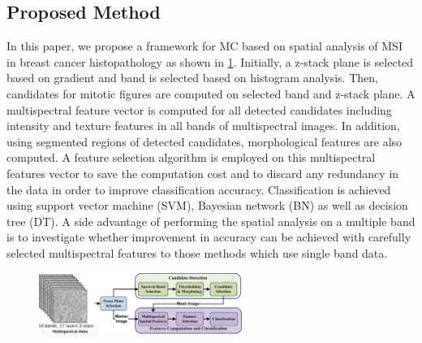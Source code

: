 \documentclass[10pt,twocolumn,letterpaper]{article}
\begin{document}
\subsection{Proposed Method}
In this paper, we propose a framework for MC based on spatial analysis of MSI in breast cancer histopathology as shown in \ref{fig:framework}. Initially, a z-stack plane is selected based on gradient and band is selected based on histogram analysis. Then, candidates for mitotic figures  are computed on selected band and z-stack plane. A multispectral feature vector is computed for all detected candidates including intensity and texture features in all bands of multispectral images. In addition, using segmented regions of detected candidates, morphological features are also computed. A feature selection algorithm is employed on this multispectral features vector to save the computation cost and to discard any redundancy in the data in order to improve classification accuracy. Classification is achieved using support vector machine (SVM), Bayesian network (BN) as well as decision tree (DT). A side advantage of performing the spatial analysis on a multiple band is to investigate whether improvement in accuracy can be achieved with carefully selected multispectral features to those methods \cite{masood2009,wu2009,wu2012} which use single band data.
\begin{figure}[t]
	\centering
	\includegraphics[width=250px]{diagrams/framework.jpg}
	\label{fig:framework}
\end{figure}
\end{document}
